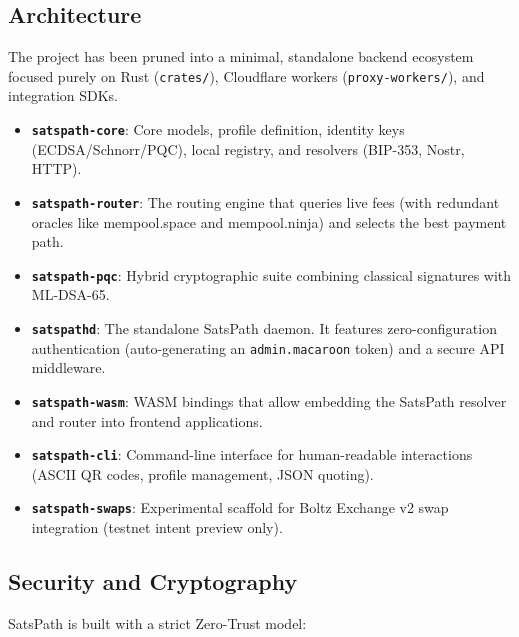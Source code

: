 \documentclass[
]{article}
\providecommand{\tightlist}{%
  \setlength{\itemsep}{0pt}\setlength{\parskip}{0pt}}
\begin{document}
\hypertarget{architecture}{%
\subsection{Architecture}\label{architecture}}

The project has been pruned into a minimal, standalone backend ecosystem
focused purely on Rust (\texttt{crates/}), Cloudflare workers
(\texttt{proxy-workers/}), and integration SDKs.

\begin{itemize}
\tightlist
\item
  \textbf{\texttt{satspath-core}}: Core models, profile definition,
  identity keys (ECDSA/Schnorr/PQC), local registry, and resolvers
  (BIP-353, Nostr, HTTP).
\item
  \textbf{\texttt{satspath-router}}: The routing engine that queries
  live fees (with redundant oracles like mempool.space and
  mempool.ninja) and selects the best payment path.
\item
  \textbf{\texttt{satspath-pqc}}: Hybrid cryptographic suite combining
  classical signatures with ML-DSA-65.
\item
  \textbf{\texttt{satspathd}}: The standalone SatsPath daemon. It
  features zero-configuration authentication (auto-generating an
  \texttt{admin.macaroon} token) and a secure API middleware.
\item
  \textbf{\texttt{satspath-wasm}}: WASM bindings that allow embedding
  the SatsPath resolver and router into frontend applications.
\item
  \textbf{\texttt{satspath-cli}}: Command-line interface for
  human-readable interactions (ASCII QR codes, profile management, JSON
  quoting).
\item
  \textbf{\texttt{satspath-swaps}}: Experimental scaffold for Boltz
  Exchange v2 swap integration (testnet intent preview only).
\end{itemize}

\hypertarget{security-and-cryptography}{%
\subsection{Security and Cryptography}\label{security-and-cryptography}}

SatsPath is built with a strict Zero-Trust model:
\end{document}
